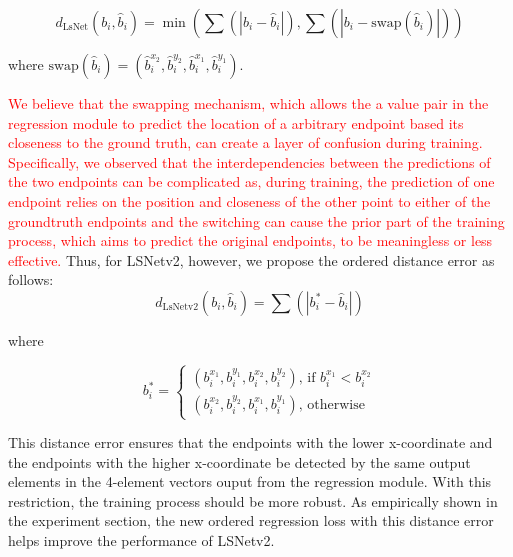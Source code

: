 \documentclass[journal]{IEEEtran}
\newcommand{\textK}[1]{\textcolor{red}{#1}}
\begin{document}
\begin{equation}
  d_{\text{LsNet}}(b_i, \hat{b}_i) = \min(\sum (|b_i - \hat{b}_i|), \sum(|b_i - \text{swap}(\hat{b}_i)|))
\end{equation}

\noindent where $\text{swap}(\hat{b}_i) = (\hat{b}_i^{x_2}, \hat{b}_i^{y_2}, \hat{b}_i^{x_1}, \hat{b}_i^{y_1})$.

\textK{We believe that the swapping mechanism, which allows the a value pair in the regression module to predict the location of a arbitrary endpoint based its closeness to the ground truth, can create a layer of confusion during training. Specifically, we observed that the interdependencies between the predictions of the two endpoints can be complicated as, during training, the prediction of one endpoint relies on the position and closeness of the other point to either of the groundtruth endpoints and the switching can cause the prior part of the training process, which aims to predict the original endpoints, to be meaningless or less effective.} Thus, for LSNetv2, however, we propose the ordered distance error as follows:
\begin{equation}
  d_{\text{LsNetv2}}(b_i, \hat{b}_i) = \sum (|b^*_i - \hat{b}_i|)
\end{equation}

\noindent where 

\begin{equation}
  b^*_i=
    \begin{cases}
       (b_i^{x_1}, b_i^{y_1}, b_i^{x_2}, b_i^{y_2}) \text{, if } b_i^{x_1} < b_i^{x_2} \\
       (b_i^{x_2}, b_i^{y_2}, b_i^{x_1}, b_i^{y_1}) \text{, otherwise }
    \end{cases}       
\end{equation}

This distance error ensures that the endpoints with the lower x-coordinate and the endpoints with the higher x-coordinate be detected by the same output elements in the 4-element vectors ouput from the regression module. With this restriction, the training process should be more robust. As empirically shown in the experiment section, the new ordered regression loss with this distance error helps improve the performance of LSNetv2.
\end{document}
